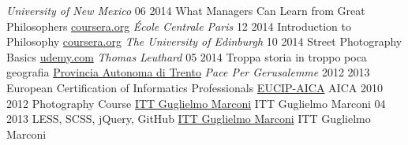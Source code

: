 \documentclass[]{friggeri-cv}
\begin{document}
\begin{entrylist}
    {\emph{University of New Mexico}}
\entry
    {06 2014}
    {What Managers Can Learn from Great Philosophers}
    {\href{http://coursera.org}{coursera.org}}
    {\emph{École Centrale Paris}}
\entry
    {12 2014}
    {Introduction to Philosophy}
    {\href{http://coursera.org}{coursera.org}}
    {\emph{The University of Edinburgh}}
\entry
    {10 2014}
    {Street Photography Basics}
    {\href{https://www.udemy.com}{udemy.com}}
    {\emph{Thomas Leuthard}}
 \entry
    {05 2014}
    {Troppa storia in troppo poca geografia}
    {\href{http://www.provincia.tn.it}{Provincia Autonoma di Trento}}
    {\emph{Pace Per Gerusalemme}}
\entry
    {2012 2013}
    {European Certification of Informatics Professionals}
    {\href{http://www.eucip.it}{EUCIP-AICA}}
    {AICA}
\entry
    {2010 2012}
    {Photography Course}
    {\href{http://marconirovereto.it}{ITT Guglielmo Marconi}}
    {ITT Guglielmo Marconi}
\entry
    {04 2013}
    {LESS, SCSS, jQuery, GitHub}
    {\href{http://marconirovereto.it}{ITT Guglielmo Marconi}}
    {ITT Guglielmo Marconi}
\end{entrylist}
\end{document}
